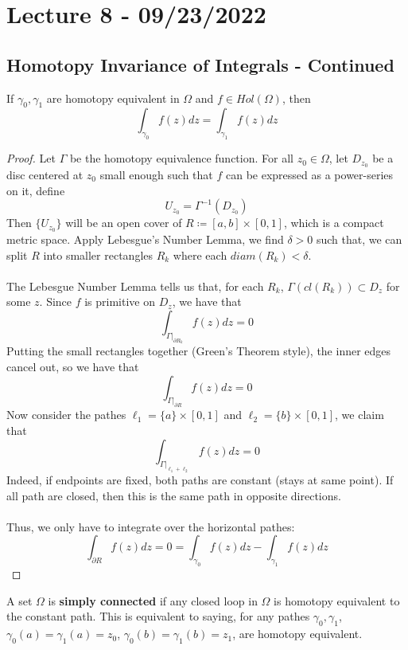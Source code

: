 \section{Lecture 8 - 09/23/2022}

\subsection{Homotopy Invariance of Integrals - Continued}

\begin{theorem}
If $\gamma_0, \gamma_1$ are homotopy equivalent in $\Omega$ and $f \in Hol(\Omega)$, then
\[\int_{\gamma_0} f(z) dz = \int_{\gamma_1} f(z) dz\]
\end{theorem}

\begin{proof}
Let $\Gamma$ be the homotopy equivalence function. For all $z_0 \in \Omega$, let $D_{z_0}$ be a disc centered at $z_0$ small enough such that $f$ can be expressed as a power-series on it, define
\[U_{z_0} = \Gamma^{-1}(D_{z_0})\]
Then $\{U_{z_0}\}$ will be an open cover of $R \coloneqq [a, b] \times [0, 1]$, which is a compact metric space. Apply Lebesgue's Number Lemma, we find $\delta > 0$ such that, we can split $R$ into smaller rectangles $R_k$ where each $diam(R_k) < \delta$.\\\\
The Lebesgue Number Lemma tells us that, for each $R_k$, $\Gamma(cl(R_k)) \subset D_{z}$ for some $z$. Since $f$ is primitive on $D_z$, we have that
\[\int_{\Gamma|_{\partial R_k}} f(z) dz = 0\]
Putting the small rectangles together (Green's Theorem style), the inner edges cancel out, so we have that
\[\int_{\Gamma|_{\partial R}} f(z) dz = 0\]
Now consider the pathes $\ell_1 = \{a\} \times [0, 1]$ and $\ell_2 = \{b\} \times [0, 1]$, we claim that
\[\int_{\Gamma|_{\ell_1 + \ell_2}} f(z) dz = 0\]
Indeed, if endpoints are fixed, both paths are constant (stays at same point). If all path are closed, then this is the same path in opposite directions.\\\\
Thus, we only have to integrate over the horizontal pathes:
\[\int_{\partial R} f(z) dz = 0 = \int_{\gamma_0} f(z) dz - \int_{\gamma_1} f(z) dz\]
\end{proof}

\begin{definition}
    A set $\Omega$ is \textbf{simply connected} if any closed loop in $\Omega$ is homotopy equivalent to the constant path. This is equivalent to saying, for any pathes $\gamma_0, \gamma_1$, $\gamma_0(a) = \gamma_1(a) = z_0$, $\gamma_0(b) = \gamma_1(b) = z_1$, are homotopy equivalent.
\end{definition}

